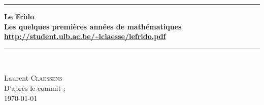



\thispagestyle{empty}
\begin{center}
  \begin{minipage}{15cm}
    \hrule\par
    \vspace{2mm}
    \begin{center}
        \Huge \bfseries Le Frido \\  {\small Les quelques premières années de mathématiques}
    \normalsize
    \url{http://student.ulb.ac.be/~lclaesse/lefrido.pdf}
    \end{center}
    \hrule\par
  \end{minipage}\\
  \vspace{0.2cm}
\end{center}

\vspace{2cm}

\begin{center}
    Laurent \textsc{Claessens}\\
    D'après le commit : \texttt{\GitCommitHexsha}\\
    \today

    \vspace{1cm}

\end{center}

\vfill





